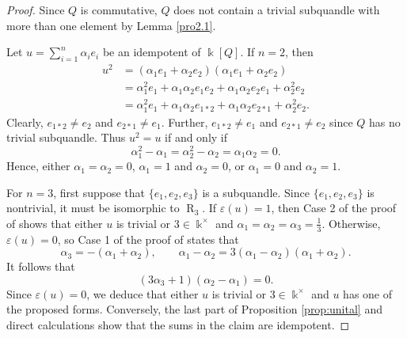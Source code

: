 \documentclass[12 pt]{amsart}
\theoremstyle{definition}
\theoremstyle{remark}
\numberwithin{equation}{section}
\newcommand{\R}{\operatorname{R}}
\renewcommand{\epsilon}{\varepsilon}
\renewcommand{\k}{\Bbbk}
\begin{document}
\begin{proof}
Since $Q$ is commutative, $Q$ does not contain a trivial subquandle with more than one element by Lemma \ref{pro2.1}.  

Let $u=\sum_{i=1}^{n}\alpha_i e_i$ be an idempotent of $\k[Q]$. If $n=2$, then
\begin{align*}
   u^2&=(\alpha_{1}e_1+\alpha_{2}e_2)(\alpha_{1}e_1+\alpha_{2}e_2)\\
   &=\alpha_{1}^{2}e_1+\alpha_{1}\alpha_{2}e_1e_2+\alpha_{1}\alpha_{2}e_2e_1+\alpha_{2}^{2}e_2\\
   &=\alpha_{1}^{2}e_1+\alpha_{1}\alpha_{2}e_{1\ast 2}+\alpha_{1}\alpha_{2}e_{2\ast1}+\alpha_{2}^{2}e_2.
\end{align*}
Clearly, $e_{1\ast 2}\neq e_2$ and $e_{2\ast1}\neq e_1$. Further, $e_{1\ast 2}\neq e_1$ and $e_{2\ast1}\neq e_2$ since $Q$ has no trivial subquandle.
Thus $u^2=u$ if and only if 
$$\alpha_{1}^{2}-\alpha_{1}
=\alpha_{2}^{2}-\alpha_{2}
     = \alpha_{1}\alpha_{2}=0.$$
         Hence, either $\alpha_{1}=\alpha_{2}=0$, $\alpha_{1}=1$ and $\alpha_{2}=0$, or  $\alpha_{1}=0$ and $\alpha_{2}=1$.
         
       For $n=3$, first suppose that $\{e_1, e_2, e_3\}$ is a subquandle. Since $\{e_1, e_2, e_3\}$ is nontrivial, it must be isomorphic to $\R_3$. If $\epsilon(u)=1$, then Case 2 of the proof of \cite[Prop.\ 4.3]{BPS-1} shows that either $u$ is trivial or $3\in\k^\times$ and $\alpha_1=\alpha_2=\alpha_3=\frac{1}{3}$. Otherwise, $\epsilon(u)=0$, so Case 1 of the proof of \cite[Prop.\ 4.3]{BPS-1} states that
       \[
       \alpha_3=-(\alpha_1+\alpha_2),\qquad \alpha_1-\alpha_2=3(\alpha_1-\alpha_2)(\alpha_1+\alpha_2).
       \]
       It follows that
       \[
       (3\alpha_3+1)(\alpha_2-\alpha_1)=0.
       \]
       Since $\epsilon(u)=0$, we deduce that either $u$ is trivial or $3\in\k^\times$ and $u$ has one of the proposed forms. 
       Conversely, the last part of Proposition \ref{prop:unital} and direct calculations show that the sums in the claim are idempotent.
       

\end{proof}
\end{document}
